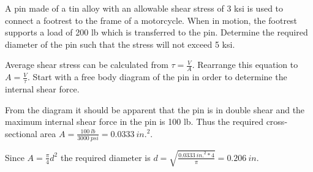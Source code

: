 \documentclass[
  letterpaper,
  DIV=11,
  numbers=noendperiod]{scrreprt}
\theoremstyle{definition}
\theoremstyle{remark}
\begin{document}
\begin{tcolorbox}[enhanced jigsaw, leftrule=.75mm, colbacktitle=quarto-callout-tip-color!10!white, breakable, opacityback=0, colback=white, titlerule=0mm, toprule=.15mm, colframe=quarto-callout-tip-color-frame, coltitle=black, title={Example 2.4}, toptitle=1mm, bottomrule=.15mm, rightrule=.15mm, left=2mm, arc=.35mm, opacitybacktitle=0.6, bottomtitle=1mm]

A pin made of a tin alloy with an allowable shear stress of 3 ksi is
used to connect a footrest to the frame of a motorcycle. When in motion,
the footrest supports a load of 200 lb which is transferred to the pin.
Determine the required diameter of the pin such that the stress will not
exceed 5 ksi.

\begin{tcolorbox}[enhanced jigsaw, leftrule=.75mm, colbacktitle=quarto-callout-tip-color!10!white, breakable, opacityback=0, colback=white, titlerule=0mm, toprule=.15mm, colframe=quarto-callout-tip-color-frame, coltitle=black, title={Solution}, toptitle=1mm, bottomrule=.15mm, rightrule=.15mm, left=2mm, arc=.35mm, opacitybacktitle=0.6, bottomtitle=1mm]

Average shear stress can be calculated from \(\tau=\frac{V}{A}\).
Rearrange this equation to \(A=\frac{V}{\tau}\). Start with a free body
diagram of the pin in order to determine the internal shear force.

From the diagram it should be apparent that the pin is in double shear
and the maximum internal shear force in the pin is 100 lb. Thus the
required cross-sectional area
\(A=\frac{100{~lb}}{3000{~psi}}=0.0333{~in.}^2\).

Since \(A=\frac{\pi}{4} d^2\) the required diameter is
\(d=\sqrt{\frac{0.0333{~in.}^2 * 4}{\pi}}=0.206{~in}\).

\end{tcolorbox}

\end{tcolorbox}
\end{document}
